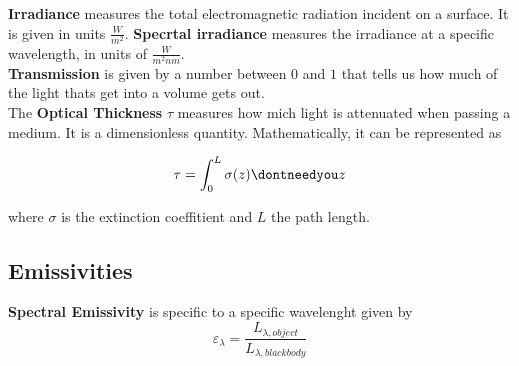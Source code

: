 \documentclass[12pt, a4paper]{article} %
\let\d\dontneedyou
\DeclareMathOperator{\d}{d}
\begin{document}
\textbf{Irradiance} measures the total electromagnetic radiation incident on a surface. It is given in units $\frac{W}{m^2}$. \textbf{Specrtal irradiance} measures the irradiance at a specific wavelength, in units of $\frac{W}{m^2nm}$. \\

\textbf{Transmission} is given by a number between $0$ and $1$ that tells us how much of the light thats get into a volume gets out. \\

The \textbf{Optical Thickness} $\tau$ measures how mich light is attenuated when passing a medium. It is a dimensionless quantity. Mathematically, it can be represented as

\begin{equation}
	\tau = \int_0^L \sigma(z) \d z
\end{equation}

where $\sigma$ is the extinction coeffitient and $L$ the path length.

\subsection{Emissivities}

\textbf{Spectral Emissivity} is specific to a specific wavelenght given by
\begin{equation}
	\varepsilon_\lambda= \frac{L_{\lambda, object}}{L_{\lambda, blackbody}}
\end{equation}
\end{document}
